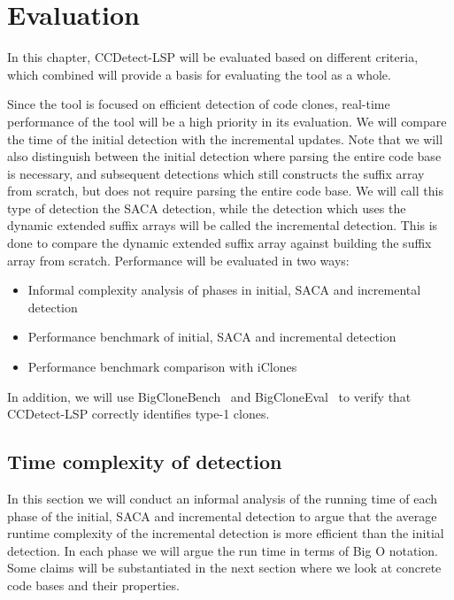 \chapter{Evaluation}
\label{evaluation}

In this chapter, CCDetect-LSP will be evaluated based on different criteria, which combined
will provide a basis for evaluating the tool as a whole.

Since the tool is focused on efficient detection of code clones, real-time performance of
the tool will be a high priority in its evaluation. We will compare the time of the
initial detection with the incremental updates. Note that we will also distinguish between
the initial detection where parsing the entire code base is necessary, and subsequent
detections which still constructs the suffix array from scratch, but does not require
parsing the entire code base. We will call this type of detection the SACA detection,
while the detection which uses the dynamic extended suffix arrays will be called the
incremental detection. This is done to compare the dynamic extended suffix array against
building the suffix array from scratch. Performance will be evaluated in two ways:

\begin{itemize}
    \item Informal complexity analysis of phases in initial, SACA and incremental detection
    \item Performance benchmark of initial, SACA and incremental detection
    \item Performance benchmark comparison with iClones~\cite{GodeIncrementalCloneDetection}
\end{itemize}

In addition, we will use BigCloneBench~\cite{BigCloneBench} and
BigCloneEval~\cite{BigCloneEval} to verify that CCDetect-LSP correctly identifies type-1
clones.

\section{Time complexity of detection}

In this section we will conduct an informal analysis of the running time of each phase of
the initial, SACA and incremental detection to argue that the average runtime complexity
of the incremental detection is more efficient than the initial detection. In each phase
we will argue the run time in terms of Big O notation. Some claims will be substantiated
in the next section where we look at concrete code bases and their properties.

